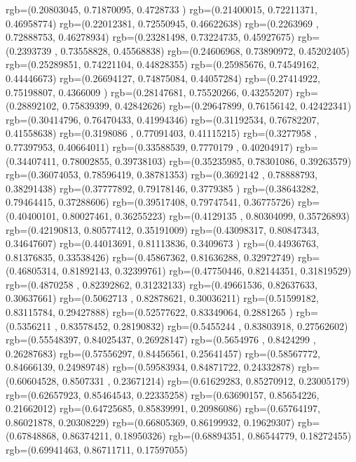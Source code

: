 {{{			rgb=(0.20803045,  0.71870095,  0.4728733 )
			rgb=(0.21400015,  0.72211371,  0.46958774)
			rgb=(0.22012381,  0.72550945,  0.46622638)
			rgb=(0.2263969 ,  0.72888753,  0.46278934)
			rgb=(0.23281498,  0.73224735,  0.45927675)
			rgb=(0.2393739 ,  0.73558828,  0.45568838)
			rgb=(0.24606968,  0.73890972,  0.45202405)
			rgb=(0.25289851,  0.74221104,  0.44828355)
			rgb=(0.25985676,  0.74549162,  0.44446673)
			rgb=(0.26694127,  0.74875084,  0.44057284)
			rgb=(0.27414922,  0.75198807,  0.4366009 )
			rgb=(0.28147681,  0.75520266,  0.43255207)
			rgb=(0.28892102,  0.75839399,  0.42842626)
			rgb=(0.29647899,  0.76156142,  0.42422341)
			rgb=(0.30414796,  0.76470433,  0.41994346)
			rgb=(0.31192534,  0.76782207,  0.41558638)
			rgb=(0.3198086 ,  0.77091403,  0.41115215)
			rgb=(0.3277958 ,  0.77397953,  0.40664011)
			rgb=(0.33588539,  0.7770179 ,  0.40204917)
			rgb=(0.34407411,  0.78002855,  0.39738103)
			rgb=(0.35235985,  0.78301086,  0.39263579)
			rgb=(0.36074053,  0.78596419,  0.38781353)
			rgb=(0.3692142 ,  0.78888793,  0.38291438)
			rgb=(0.37777892,  0.79178146,  0.3779385 )
			rgb=(0.38643282,  0.79464415,  0.37288606)
			rgb=(0.39517408,  0.79747541,  0.36775726)
			rgb=(0.40400101,  0.80027461,  0.36255223)
			rgb=(0.4129135 ,  0.80304099,  0.35726893)
			rgb=(0.42190813,  0.80577412,  0.35191009)
			rgb=(0.43098317,  0.80847343,  0.34647607)
			rgb=(0.44013691,  0.81113836,  0.3409673 )
			rgb=(0.44936763,  0.81376835,  0.33538426)
			rgb=(0.45867362,  0.81636288,  0.32972749)
			rgb=(0.46805314,  0.81892143,  0.32399761)
			rgb=(0.47750446,  0.82144351,  0.31819529)
			rgb=(0.4870258 ,  0.82392862,  0.31232133)
			rgb=(0.49661536,  0.82637633,  0.30637661)
			rgb=(0.5062713 ,  0.82878621,  0.30036211)
			rgb=(0.51599182,  0.83115784,  0.29427888)
			rgb=(0.52577622,  0.83349064,  0.2881265 )
			rgb=(0.5356211 ,  0.83578452,  0.28190832)
			rgb=(0.5455244 ,  0.83803918,  0.27562602)
			rgb=(0.55548397,  0.84025437,  0.26928147)
			rgb=(0.5654976 ,  0.8424299 ,  0.26287683)
			rgb=(0.57556297,  0.84456561,  0.25641457)
			rgb=(0.58567772,  0.84666139,  0.24989748)
			rgb=(0.59583934,  0.84871722,  0.24332878)
			rgb=(0.60604528,  0.8507331 ,  0.23671214)
			rgb=(0.61629283,  0.85270912,  0.23005179)
			rgb=(0.62657923,  0.85464543,  0.22335258)
			rgb=(0.63690157,  0.85654226,  0.21662012)
			rgb=(0.64725685,  0.85839991,  0.20986086)
			rgb=(0.65764197,  0.86021878,  0.20308229)
			rgb=(0.66805369,  0.86199932,  0.19629307)
			rgb=(0.67848868,  0.86374211,  0.18950326)
			rgb=(0.68894351,  0.86544779,  0.18272455)
			rgb=(0.69941463,  0.86711711,  0.17597055)
}}}
